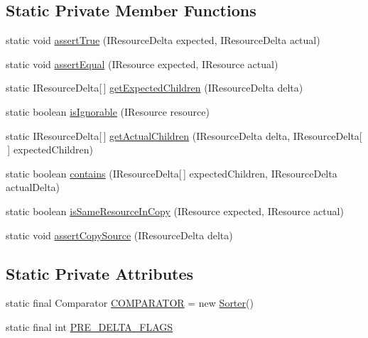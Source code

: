 \subsection*{Static Private Member Functions}
\begin{DoxyCompactItemize}
\item 
static void \hyperlink{classorg_1_1eclipse_1_1jdt_1_1ui_1_1tests_1_1refactoring_1_1infra_1_1TestModelProvider_a92403097c85752447ef41af7e0b7fbb1}{assertTrue} (IResourceDelta expected, IResourceDelta actual)
\item 
static void \hyperlink{classorg_1_1eclipse_1_1jdt_1_1ui_1_1tests_1_1refactoring_1_1infra_1_1TestModelProvider_afcef813fa077d730dd0bd792ad6be73a}{assertEqual} (IResource expected, IResource actual)
\item 
static IResourceDelta\mbox{[}$\,$\mbox{]} \hyperlink{classorg_1_1eclipse_1_1jdt_1_1ui_1_1tests_1_1refactoring_1_1infra_1_1TestModelProvider_aa98e75738fb52c2e8fb9b30a17f03697}{getExpectedChildren} (IResourceDelta delta)
\item 
static boolean \hyperlink{classorg_1_1eclipse_1_1jdt_1_1ui_1_1tests_1_1refactoring_1_1infra_1_1TestModelProvider_af6489f606abe93b8ab14716e64fcfa7d}{isIgnorable} (IResource resource)
\item 
static IResourceDelta\mbox{[}$\,$\mbox{]} \hyperlink{classorg_1_1eclipse_1_1jdt_1_1ui_1_1tests_1_1refactoring_1_1infra_1_1TestModelProvider_a58dde27f4b384906fdfeeede2e811f13}{getActualChildren} (IResourceDelta delta, IResourceDelta\mbox{[}$\,$\mbox{]} expectedChildren)
\item 
static boolean \hyperlink{classorg_1_1eclipse_1_1jdt_1_1ui_1_1tests_1_1refactoring_1_1infra_1_1TestModelProvider_a39c673b4dfd9b458b23e3b66c92b29bd}{contains} (IResourceDelta\mbox{[}$\,$\mbox{]} expectedChildren, IResourceDelta actualDelta)
\item 
static boolean \hyperlink{classorg_1_1eclipse_1_1jdt_1_1ui_1_1tests_1_1refactoring_1_1infra_1_1TestModelProvider_a9522bbcc5d0fb447e6bd719e9e94a0b1}{isSameResourceInCopy} (IResource expected, IResource actual)
\item 
static void \hyperlink{classorg_1_1eclipse_1_1jdt_1_1ui_1_1tests_1_1refactoring_1_1infra_1_1TestModelProvider_af63a1c64cc8a9524aa028eb16f95cad5}{assertCopySource} (IResourceDelta delta)
\end{DoxyCompactItemize}
\subsection*{Static Private Attributes}
\begin{DoxyCompactItemize}
\item 
static final Comparator \hyperlink{classorg_1_1eclipse_1_1jdt_1_1ui_1_1tests_1_1refactoring_1_1infra_1_1TestModelProvider_a34c064542b9901265edfad9cc8e10c97}{COMPARATOR} = new \hyperlink{classorg_1_1eclipse_1_1jdt_1_1ui_1_1tests_1_1refactoring_1_1infra_1_1TestModelProvider_1_1Sorter}{Sorter}()
\item 
static final int \hyperlink{classorg_1_1eclipse_1_1jdt_1_1ui_1_1tests_1_1refactoring_1_1infra_1_1TestModelProvider_aa3f53621c627feb54da436301e629de8}{PRE\_\-DELTA\_\-FLAGS}
\end{DoxyCompactItemize}


